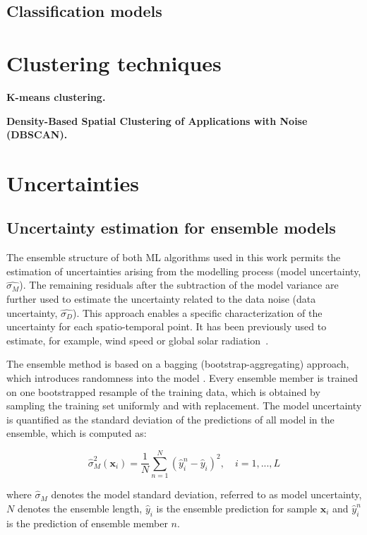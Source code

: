 \subsection{Classification models}

 
\section{Clustering techniques}
\textbf{K-means clustering.}

\textbf{Density-Based Spatial Clustering of Applications with Noise (DBSCAN).}


\section{Uncertainties}
\subsection{Uncertainty estimation for ensemble models}
\label{unc_ML}

The ensemble structure of both ML algorithms used in this work permits the estimation of uncertainties arising from the modelling process (model uncertainty, $\hat{\sigma_M}$). The remaining residuals after the subtraction of the model variance are further used to estimate the uncertainty related to the data noise (data uncertainty, $\hat{\sigma_D}$). 
This approach enables a specific characterization of the uncertainty for each spatio-temporal point.
It has been previously used to estimate, for example, wind speed or global solar radiation~\cite{walch_spatio-temporal_2019, wan_probabilistic_2014}.

The ensemble method is based on a bagging (bootstrap-aggregating) approach, which introduces randomness into the model  \cite{breiman_bagging_1996}.
Every ensemble member is trained on one bootstrapped resample of the training data, which is
obtained by sampling the training set uniformly and with replacement.
The model uncertainty is quantified as the standard deviation of the predictions of all model in the ensemble, which is computed as:

\begin{equation}
\label{eq:model_unc}
  \hat{\sigma}_M^2 (\mathbf{x}_i) = \frac{1}{N} \sum_{n=1}^N (\hat{y}_i^n - \hat{y}_i)^2, \quad i=1,...,L
\end{equation}

where $\hat{\sigma}_M$ denotes the model standard deviation, referred to as model uncertainty, $N$ denotes the ensemble length, $\hat{y}_i$ is the ensemble prediction for sample $\mathbf{x}_i$ and $\hat{y}_i^n$ is the prediction of ensemble member $n$.

